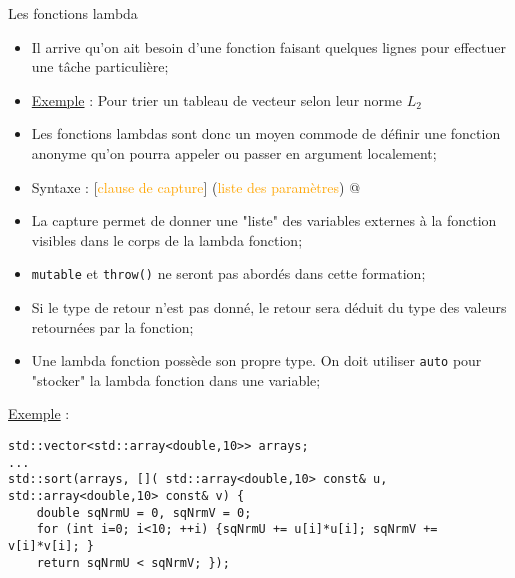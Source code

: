 \documentclass[compress,10pt,aspectratio=169]{beamer}
\begin{document}
\begin{frame}[fragile]{Les fonctions lambda}
  \scriptsize
  
\vspace*{-2mm}
\begin{itemize}
\item Il arrive qu'on ait besoin d'une fonction faisant quelques lignes pour effectuer une tâche particulière;
\item \underline{Exemple} : Pour trier un tableau de vecteur selon leur norme $L_{2}$
\item Les fonctions lambdas sont donc un moyen commode de définir une fonction anonyme qu'on pourra appeler ou passer en argument localement;
\item Syntaxe : [\textcolor{orange}{clause de capture}] 
(\textcolor{orange}{liste des paramètres}) 
\Shortunderstack{{-$>$\textcolor{orange}{type retour}} \textcolor{orange}{optionnel}} @
\item La capture permet de donner une "liste" des variables externes à la fonction visibles dans le corps de la lambda fonction;
\item \texttt{mutable} et \texttt{throw()} ne seront pas abordés dans cette formation;
\item Si le type de retour n'est pas donné, le retour sera déduit du type des valeurs retournées par la fonction;
\item Une lambda fonction possède son propre type. On doit utiliser \texttt{auto} pour "stocker" la lambda fonction dans une variable;
\end{itemize}

\underline{Exemple} :
\begin{verbatim}
std::vector<std::array<double,10>> arrays;
... 
std::sort(arrays, []( std::array<double,10> const& u, std::array<double,10> const& v) {
    double sqNrmU = 0, sqNrmV = 0;
    for (int i=0; i<10; ++i) {sqNrmU += u[i]*u[i]; sqNrmV += v[i]*v[i]; }
    return sqNrmU < sqNrmV; });
\end{verbatim}
\end{frame}
\end{document}
